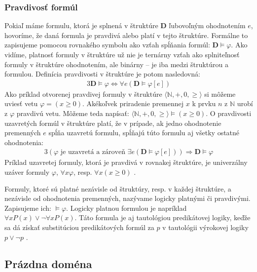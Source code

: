 \documentclass[12pt, letterpaper]{article}
\begin{document}
\subsubsection{Pravdivosť formúl}
\label{subsubsec:truth}
Pokiaľ máme formulu, ktorá je splnená v štruktúre \textbf{D} ľubovoľným ohodnotením $e$, hovoríme, že daná formula je pravdivá alebo platí v tejto štruktúre. Formálne to zapisujeme pomocou rovnakého symbolu ako vzťah spĺňania formúl: $\textbf{D}\models\varphi$. Ako vidíme, platnosť formuly v štruktúre už nie je ternárny vzťah ako splniteľnosť formuly v štruktúre ohodnotením, ale binárny -- je iba medzi štruktúrou a formulou. Definícia pravdivosti v štruktúre je potom nasledovná:
\begin{alignat}{3}
	\mathbf{D}\models\varphi \iff \forall e (\mathbf{D}\models\varphi[e]) \label{trueinD}
\end{alignat}
Ako príklad otvorenej pravdivej formuly v štruktúre $\langle\mathbb{N}, +, 0, \geq\rangle$ si môžeme uviesť vetu  $\varphi=(x\geq0)$. Akékoľvek priradenie premennej $x$ k prvku $n$ z $\mathbb{N}$ urobí z $\varphi$ pravdivú vetu. Môžeme teda napísať: $\langle\mathbb{N}, +, 0, \geq\rangle\models(x\geq0)$. O pravdivosti uzavretých formúl v štruktúre platí, že v prípade, ak jedno ohodnotenie premenných $e$ spĺňa uzavretú formulu, spĺňajú túto formulu aj všetky ostatné ohodnotenia:
\begin{alignat}{3}
	(\text{$\varphi$ je uzavretá a zároveň } \exists e(\mathbf{D}\models\varphi[e])) \Rightarrow \mathbf{D}\models\varphi \label{trueinDSent}
\end{alignat}
Príklad uzavretej formuly, ktorá je pravdivá v rovnakej štruktúre, je univerzálny uzáver formuly $\varphi$, $\forall x \varphi$, resp. $\forall x (x\geq0)$ \parencites{shapiro_classical_2022}[144]{svejdar_logika_2002}.\par

Formuly, ktoré sú platné nezávisle od štruktúry, resp. v každej štruktúre, a nezávisle od ohodnotenia premenných, nazývame logicky platnými či pravdivými. Zapisujeme ich: $\models\varphi$. Logicky platnou formulou je napríklad $\forall x P(x) \lor \neg \forall x P(x)$. Táto formula je aj tautológiou predikátovej logiky, keďže sa dá získať substitúciou predikátových formúl za $p$ v tautológii výrokovej logiky $p \lor \neg p$ \parencites[51--52, 55]{raclavsky_uvod_2015}[147, 157]{svejdar_logika_2002}.


\subsection{Prázdna doména}
\end{document}

